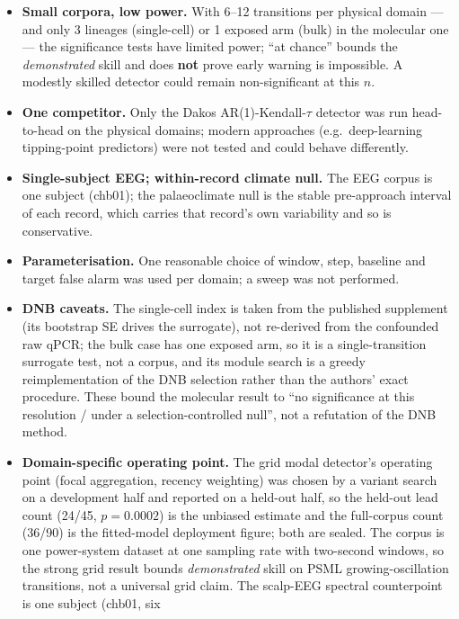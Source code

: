 \documentclass[11pt]{article}
\begin{document}
\begin{itemize}
  \item \textbf{Small corpora, low power.} With 6--12 transitions per
    physical domain --- and only 3 lineages (single-cell) or 1 exposed
    arm (bulk) in the molecular one --- the significance tests have
    limited power; ``at chance'' bounds the \emph{demonstrated} skill
    and does \textbf{not} prove early warning is impossible. A modestly
    skilled detector could remain non-significant at this $n$.
  \item \textbf{One competitor.} Only the Dakos AR(1)-Kendall-$\tau$
    detector was run head-to-head on the physical domains; modern
    approaches (e.g.\ deep-learning tipping-point predictors) were not
    tested and could behave differently.
  \item \textbf{Single-subject EEG; within-record climate null.} The EEG
    corpus is one subject (chb01); the palaeoclimate null is the stable
    pre-approach interval of each record, which carries that record's
    own variability and so is conservative.
  \item \textbf{Parameterisation.} One reasonable choice of window,
    step, baseline and target false alarm was used per domain; a sweep
    was not performed.
  \item \textbf{DNB caveats.} The single-cell index is taken from the
    published supplement (its bootstrap SE drives the surrogate), not
    re-derived from the confounded raw qPCR; the bulk case has one
    exposed arm, so it is a single-transition surrogate test, not a
    corpus, and its module search is a greedy reimplementation of the
    DNB selection rather than the authors' exact procedure. These bound
    the molecular result to ``no significance at this resolution / under
    a selection-controlled null'', not a refutation of the DNB method.
  \item \textbf{Domain-specific operating point.} The grid modal
    detector's operating point (focal aggregation, recency weighting)
    was chosen by a variant search on a development half and reported on
    a held-out half, so the held-out lead count (24/45, $p = 0.0002$) is
    the unbiased estimate and the full-corpus count (36/90) is the
    fitted-model deployment figure; both are sealed. The corpus is one
    power-system dataset at one sampling rate with two-second windows,
    so the strong grid result bounds \emph{demonstrated} skill on PSML
    growing-oscillation transitions, not a universal grid claim. The
    scalp-EEG spectral counterpoint is one subject (chb01, six

\end{itemize}
\end{document}
